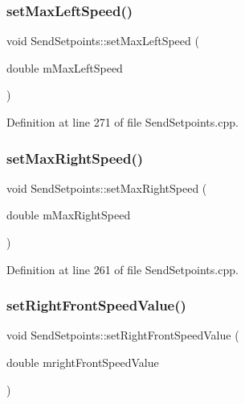 \subsubsection{\texorpdfstring{set\+Max\+Left\+Speed()}{setMaxLeftSpeed()}}
{\footnotesize\ttfamily void Send\+Setpoints\+::set\+Max\+Left\+Speed (\begin{DoxyParamCaption}\item[{double}]{m\+Max\+Left\+Speed }\end{DoxyParamCaption})}



Definition at line 271 of file Send\+Setpoints.\+cpp.

\mbox{\label{class_send_setpoints_aa053b6ff914fbb8837ff5298f9b4e0f6}} 
\subsubsection{\texorpdfstring{set\+Max\+Right\+Speed()}{setMaxRightSpeed()}}
{\footnotesize\ttfamily void Send\+Setpoints\+::set\+Max\+Right\+Speed (\begin{DoxyParamCaption}\item[{double}]{m\+Max\+Right\+Speed }\end{DoxyParamCaption})}



Definition at line 261 of file Send\+Setpoints.\+cpp.

\mbox{\label{class_send_setpoints_ac4a206b4a1b4847749c817bcb473f3bc}} 
\subsubsection{\texorpdfstring{set\+Right\+Front\+Speed\+Value()}{setRightFrontSpeedValue()}}
{\footnotesize\ttfamily void Send\+Setpoints\+::set\+Right\+Front\+Speed\+Value (\begin{DoxyParamCaption}\item[{double}]{mright\+Front\+Speed\+Value }\end{DoxyParamCaption})}



